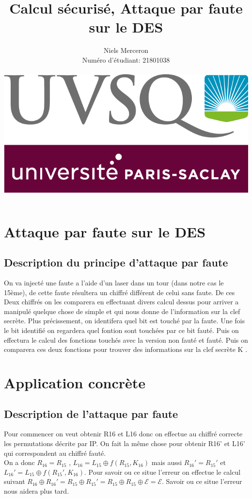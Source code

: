 \documentclass[a4paper]{report}
\date{}
\title{Calcul sécurisé, Attaque par faute sur le DES}
\author{Niels Merceron \\ Numéro d'étudiant: 21801038 \\ \\ \includegraphics[scale=0.20]{logo-UVSQ-2020-RVB.png}}
\begin{document}
	\maketitle
	
	\newpage
	 \tableofcontents
		\chapter{Attaque par faute sur le DES}
			\section{Description du principe d'attaque par faute}
			
			\newpage
			
			 
			On va injecté une faute a l'aide d'un laser dans un tour (dans notre cas le 15ème), de cette faute résultera un chiffré différent de celui sans faute.
			De ces Deux chiffrés on les comparera en effectuant divers calcul dessus pour arriver a manipulé quelque chose de simple et qui nous donne de l'information sur la clef secrète.
			Plus précissement, on identifera quel bit est touché par la faute. Une fois le bit identifié on regardera quel fontion sont touchées par ce bit fauté.
			Puis on effectura le calcul des fonctions touchés avec la version non fauté et fauté. Puis on comparera ces deux fonctions pour trouver des informations sur la clef secrète K .
		\chapter{Application concrète}
			\section{Description de l'attaque par faute}
			Pour commencer on veut obtenir R16 et L16 donc on effectue au chiffré correcte les permutations décrite par IP. On fait la même chose pour obtenir R16' et L16' qui correspondent au chiffré fauté.\\
			On a donc $R_{16} = R_{15}$ , $L_{16} = L_{15}\oplus f(R_{15},K_{16})$ mais aussi $R_{16}'=R_{15}'$ et $L_{16}'=L_{15}\oplus f(R_{15}',K_{16})$.
			Pour savoir ou ce situe l'erreur on effectue le calcul suivant $R_{16}\oplus R_{16}' = R_{15}\oplus R_{15}' = R_{15}\oplus R_{15}\oplus \mathcal{E} = \mathcal{E}$. Savoir ou ce situe l'erreur nous aidera plus tard.\\
			
\end{document}
